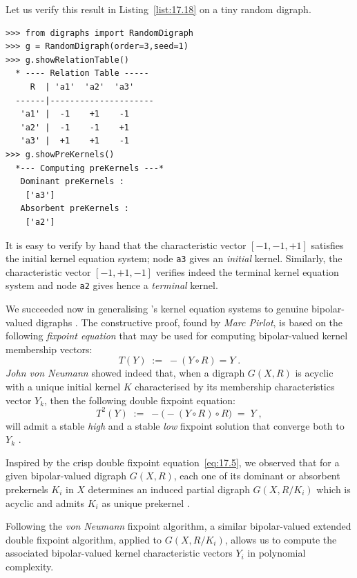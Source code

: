 Let us verify this result in Listing~\vref{list:17.18} on a tiny random digraph.
\begin{lstlisting}[caption={Verifying the kernel equation system on a tiny random digraph},label=list:17.18]
>>> from digraphs import RandomDigraph
>>> g = RandomDigraph(order=3,seed=1)
>>> g.showRelationTable()
  * ---- Relation Table -----
     R  | 'a1'  'a2'  'a3'	  
  ------|---------------------
   'a1' |  -1    +1    -1	 
   'a2' |  -1    -1    +1	 
   'a3' |  +1    +1    -1	 
>>> g.showPreKernels()
  *--- Computing preKernels ---*
   Dominant preKernels :
    ['a3']
   Absorbent preKernels :
    ['a2']
\end{lstlisting}

It is easy to verify by hand that the characteristic vector $[-1, -1, +1]$ satisfies the initial kernel equation system; node \texttt{a3} gives an \emph{initial} kernel. Similarly, the characteristic vector $[-1, +1, -1]$ verifies indeed the terminal kernel equation system and node \texttt{a2} gives hence a \emph{terminal} kernel.

We succeeded now in generalising \Berge's kernel equation systems to genuine bipolar-valued digraphs \citep*{BIS-2006a,BIS-2006b}. The constructive proof, found by \emph{Marc Pirlot}, is based on the following \emph{fixpoint equation} that may be used for computing bipolar-valued kernel membership vectors:
\begin{equation}\label{eq:17.4}
T(Y) \; := \; -(Y \circ R) = Y\;.
\end{equation}
\emph{John von Neumann} showed indeed that, when a digraph $G(X,R)$ is acyclic with a unique initial kernel $K$ characterised by its membership characteristics vector $Y_k$, then the following double fixpoint equation:
\begin{equation}\label{eq:17.5}
T^2(Y) \; := \; -\big( -(Y \circ R) \circ R) \; = \; Y\;,
\end{equation}
will admit a stable \emph{high} and a stable \emph{low} fixpoint solution that converge both to $Y_k$ \citep{SCH-1985}.

Inspired by the crisp double fixpoint equation~\vref{eq:17.5}, we observed that for a given bipolar-valued digraph $G(X,R)$, each one of its dominant or absorbent prekernels $K_i$ in $X$ determines an induced partial digraph $G(X,R/K_i)$ which is acyclic and admits $K_i$ as unique prekernel \citep{BIS-2006b}.

Following the \emph{von Neumann} fixpoint algorithm, a similar bipolar-valued extended double fixpoint algorithm, applied to $G(X,R/K_i)$, allows us to compute the associated bipolar-valued kernel characteristic vectors $Y_i$ in polynomial complexity.

